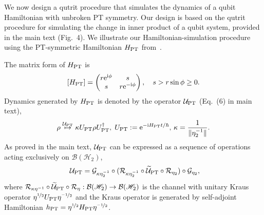\documentclass[amsmath,amssymb,aps,pra,superscriptaddress,twocolumn]{revtex4-2}
\begin{document}
\begin{appendix}
We now design a qutrit procedure that simulates the dynamics of a qubit Hamiltonian with unbroken PT symmetry.
Our design is based on the qutrit procedure for simulating the change in inner product of a qubit system, 
provided in the main text  (Fig.~4). 
We illustrate our Hamiltonian-simulation procedure using the PT-symmetric Hamiltonian $H_{\rm PT}$ from~\cite{BBJ02}. 

The matrix form of  $H_{\rm PT}$ is
\begin{equation}
\label{eq:qubitHPT}
    \left[H_{\rm PT}\right] = \begin{pmatrix}
    r\text{e}^{{\rm i}\phi} & s \\ s & r\text{e}^{-{\rm i}\phi}\end{pmatrix}, \quad s>r\sin\phi\ge 0.
\end{equation}
Dynamics generated by $H_{\rm PT}$ is denoted by the operator $\mathcal{U}_{\rm PT}$ (Eq.~(6) in main text),
\begin{equation}
    \rho \stackrel{\mathcal{U}_{\rm PT}}{\mapsto} \kappa U_{\rm{PT}}\rho U^\dagger_{\rm{PT}}, \; U_{\rm{PT}} := \text{e}^{-\text{i}H_{\rm {PT}}t/\hbar},\, \kappa = \frac{1}{\|\eta_2^{-1}\|}.
\end{equation}
As proved in the main text, $\mathcal{U}_{\rm PT}$ can be expressed as a sequence of operations acting exclusively on 
$ \mathcal{B}(\mathscr{H}_2)$,
\begin{equation}~\label{eq:simulatingUPT}
     \mathcal{U}_{\rm{PT}}= {\mathcal{G}}_{\kappa \eta^{-1}_2} \circ (\mathcal{R}_{\kappa\eta^{-1}_2} \circ \widetilde{\mathcal{U}}_{\rm{PT}} \circ \mathcal{R}_{\eta_2})\circ \mathcal{G}_{\eta_2},
\end{equation}
where
$\mathcal{R}_{\kappa\eta^{-1}} \circ \widetilde{\mathcal{U}}_{\rm{PT}} \circ \mathcal{R}_{\eta}: \mathcal{B}(\mathscr{H}_2)\to \mathcal{B}(\mathscr{H}_2)$
is the channel with unitary Kraus operator $\eta^{\nicefrac{1}{2}}U_{\rm PT}\eta^{\nicefrac{-1}{2}}$ and
the Kraus operator is generated by self-adjoint Hamiltonian $ h_{\rm PT} = \eta^{\nicefrac{1}{2}}H_{\rm PT}\eta^{\nicefrac{-1}{2}}$.


\end{appendix}
\end{document}
